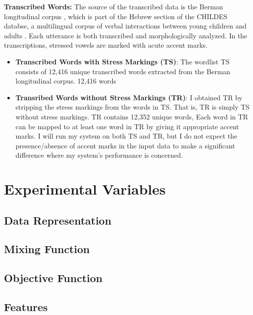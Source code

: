 \textbf{Transcribed Words:} The source of the transcribed data is the Berman longitudinal corpus \citep{berman-weissenborn:1991}, which is part of the Hebrew section of the CHILDES databse, a multilingual corpus of verbal interactions between young children and adults \citep{macwhinney:2000a}. Each utterance is both transcribed and morphologically analyzed. In the transcriptions, stressed vowels are marked with acute accent marks.  
   \begin{itemize}
   	\item \textbf{Transcribed Words with Stress Markings (TS)}: The wordlist TS consists of 12,416 unique transcribed words extracted from the Berman longitudinal corpus.
12,416 words
	\item \textbf{Transribed Words without Stress Markings (TR)}: I obtained TR by stripping the stress markings from the words in TS. That is, TR is simply TS without stress markings. TR contains 12,352 unique words, Each word in TR can be mapped to at least one word in TR by giving it appropriate accent marks.
	I will run my system on both TS and TR, but I do not expect the presence/absence of accent marks in the input data to make a significant difference where my system's performance is concerned.
\end{itemize}	



\section{Experimental Variables}
\subsection{Data Representation}
\subsection{Mixing Function}
\subsection{Objective Function}

\subsection{Features}
